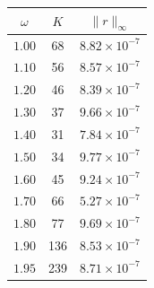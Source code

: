 \begin{tabular}{ccc}
\toprule
$\omega$ & $K$ & $\|r\|_\infty$ \\
\midrule
$1.00$ & 68 & $8.82\times10^{-7}$ \\
$1.10$ & 56 & $8.57\times10^{-7}$ \\
$1.20$ & 46 & $8.39\times10^{-7}$ \\
$1.30$ & 37 & $9.66\times10^{-7}$ \\
$1.40$ & 31 & $7.84\times10^{-7}$ \\
$1.50$ & 34 & $9.77\times10^{-7}$ \\
$1.60$ & 45 & $9.24\times10^{-7}$ \\
$1.70$ & 66 & $5.27\times10^{-7}$ \\
$1.80$ & 77 & $9.69\times10^{-7}$ \\
$1.90$ & 136 & $8.53\times10^{-7}$ \\
$1.95$ & 239 & $8.71\times10^{-7}$ \\
\bottomrule
\end{tabular}
